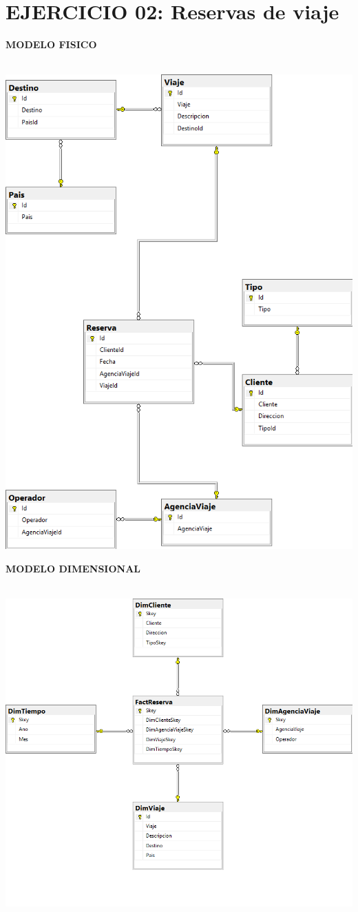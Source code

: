 \section{EJERCICIO 02: Reservas de viaje}

\textbf{MODELO FISICO}\\\\
\begin{center}
\includegraphics[width=\columnwidth]{images/task2/e2}\newline
\end{center}

\textbf{MODELO DIMENSIONAL}\\\\
\begin{center}
\includegraphics[width=\columnwidth]{images/task2/d2}\newline
\end{center}